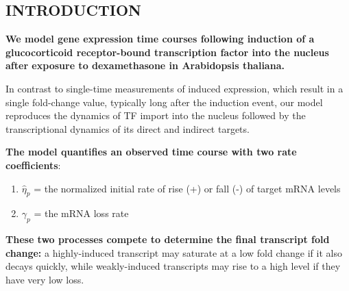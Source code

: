 \documentclass[aspb,landscape]{a0poster}
\begin{document}
\begin{multicols}{3} %

  \color{Black} %




  {
    \titlespacing{\section}{0pt}{0pt}{0pt}
    \section*{INTRODUCTION}

    \textbf{We model gene expression time courses following induction of a glucocorticoid receptor-bound transcription factor into the nucleus after exposure to dexamethasone in Arabidopsis thaliana.}
    
    In contrast to single-time measurements of induced expression, which result in a single fold-change value, typically long after the induction event,
    our model reproduces the dynamics of TF import into the nucleus followed by the transcriptional dynamics of its direct and indirect targets.
    
    \textbf{The model quantifies an observed time course with two rate coefficients}:
    \begin{enumerate}
    \item $\hat{\eta}_p$ = the normalized initial rate of rise (+) or fall (-) of target mRNA levels
    \item $\gamma_p$ = the mRNA loss rate
    \end{enumerate}
    \textbf{These two processes compete to determine the final transcript fold change:} a highly-induced transcript may saturate at a low fold change if it also decays quickly,
    while weakly-induced transcripts may rise to a high level if they have very low loss.
    
}
\end{multicols}
\end{document}
